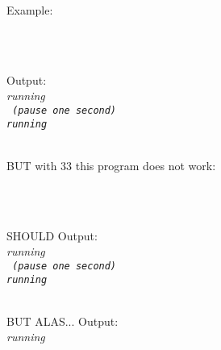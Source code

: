 \documentclass[a4paper, landscape]{article}
\begin{document}
\bigskip
\noindent
Example:

\tt
\indent {} \\
\indent \KeyAfic \\
\rm

\bigskip

Output:\\
\it running \rm \\
\tt {} \indent \it (pause one second)\\
\it running \rm \\
\tt {} \\
\rm

\bigskip

\clearpage
\bigskip
\noindent
BUT with 33 this program does not work:

\tt
\indent {} \\
\indent \KeyAfic \\
\rm

\bigskip

SHOULD Output:\\
\it running \rm \\
\tt {} \indent \it (pause one second)\\
\it running \rm \\
\tt {} \\
\rm

\bigskip

BUT ALAS... Output:\\
\it running \rm \\
\tt {} \\
\rm

\bigskip
\end{document}
